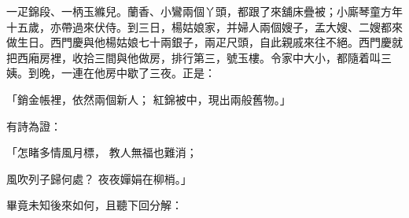 一疋錦段、一柄玉縧兒。蘭香、小鸞兩個丫頭，都跟了來舖床疊被；小廝琴童方年十五歲，亦帶過來伏侍。到三日，楊姑娘家，并婦人兩個嫂子，孟大嫂、二嫂都來做生日。西門慶與他楊姑娘七十兩銀子，兩疋尺頭，自此親戚來往不絕。西門慶就把西廂房裡，收拾三間與他做房，排行第三，號玉樓。令家中大小，都隨着叫三姨。到晚，一連在他房中歇了三夜。正是：

「銷金帳裡，依然兩個新人；  紅錦被中，現出兩般舊物。」

有詩為證：

「怎睹多情風月標，  教人無福也難消；

風吹列子歸何處？  夜夜嬋娟在柳梢。」

畢竟未知後來如何，且聽下回分解：
